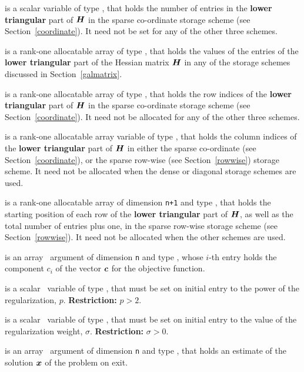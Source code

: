 \documentclass{galahad}
\begin{document}
\begin{description}
\begin{description}
 is a scalar variable of type \integer, that
holds the number of entries in the {\bf lower triangular} part of ${\bm{H}}$
in the sparse co-ordinate storage scheme (see Section~\ref{coordinate}).
It need not be set for any of the other three schemes.

 is a rank-one allocatable array of type \realdp, that holds
the values of the entries of the {\bf lower triangular} part
of the Hessian matrix ${\bm{H}}$ in any of the
storage schemes discussed in Section~\ref{galmatrix}.

 is a rank-one allocatable array of type \integer,
that holds the row indices of the {\bf lower triangular} part of ${\bm{H}}$
in the sparse co-ordinate storage
scheme (see Section~\ref{coordinate}).
It need not be allocated for any of the other three schemes.

 is a rank-one allocatable array variable of type \integer,
that holds the column indices of the {\bf lower triangular} part of
${\bm{H}}$ in either the sparse co-ordinate
(see Section~\ref{coordinate}), or the sparse row-wise
(see Section~\ref{rowwise}) storage scheme.
It need not be allocated when the dense or diagonal storage schemes are used.

 is a rank-one allocatable array of dimension {\tt n+1} and type
\integer, that holds the starting position of
each row of the {\bf lower triangular} part of ${\bm{H}}$, as well
as the total number of entries plus one, in the sparse row-wise storage
scheme (see Section~\ref{rowwise}). It need not be allocated when the
other schemes are used.

\end{description}

 is an array \intentin\ argument of dimension {\tt n} and
type \realdp,  whose $i$-th entry holds the component $c_i$ of
the vector ${\bm{c}}$ for the objective function.

 is a scalar \intentin\ variable of type \realdp,
that must be set on initial entry to the power of the regularization, $p$.
{\bf Restriction: } $p > 2$.

 is a scalar \intentin\ variable of type \realdp,
that must be set on initial entry
to the value of the regularization weight, $\sigma$.
{\bf Restriction: } $\sigma > 0$.

 is an array \intentout\ argument of dimension {\tt n} and
type \realdp, that holds an estimate of the solution ${\bm{x}}$
of the problem on exit.


\end{description}
\end{document}
